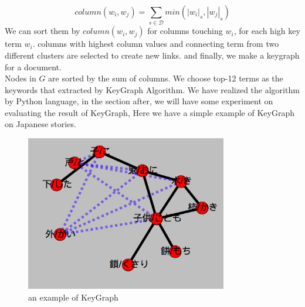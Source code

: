 \begin{displaymath}
column(w_i,w_j)=\sum_{s\in \mathcal{D}}min(|w_i|_s,|w_j|_s)
\end{displaymath}
We can sort them by $column(w_i,w_j)$ for columns touching $w_i$, for each high key term $w_i$. columns with highest column values and connecting term from two different clusters are selected to create new links. and finally, we make a keygraph for a document.\\
Nodes in $G$ are sorted by the sum of columns. We choose top-12 terms as the keywords that extracted by KeyGraph Algorithm.
We have realized the algorithm by Python language, in the section after, we will have some experiment on evaluating the result of KeyGraph, Here we have a simple example of KeyGraph on Japanese stories.
\begin{figure}[!hbp]
\centering
\includegraphics[width=250pt]{./pictures/0203-1.png}
\caption{an example of KeyGraph}
\end{figure}